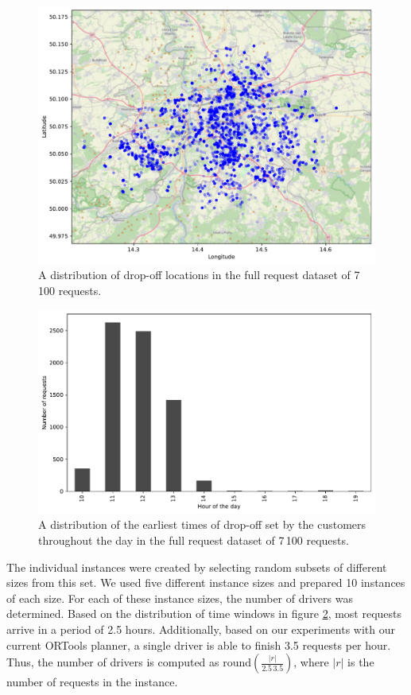     \begin{figure}[!ht]
        \centering
        \includegraphics[width=\textwidth]{figures/dataset-map.pdf}
        \caption{A distribution of drop-off locations in the full request dataset of 7\,100 requests.}
        \label{fig:dataset-map}
    \end{figure}
    
    \begin{figure}[!ht]
        \centering
        \includegraphics[width=\textwidth]{figures/dataset-distribution.pdf}
        \caption{A distribution of the earliest times of drop-off set by the customers throughout the day in the full request dataset of 7\,100 requests.}
        \label{fig:dataset-distribution}
    \end{figure}

    The individual instances were created by selecting random subsets of different sizes from this set. We used five different instance sizes and prepared 10 instances of each size. For each of these instance sizes, the number of drivers was determined. Based on the distribution of time windows in figure \ref{fig:dataset-distribution}, most requests arrive in a period of 2.5 hours. Additionally, based on our experiments with our current ORTools planner, a single driver is able to finish 3.5 requests per hour. Thus, the number of drivers is computed as $\mathrm{round}(\frac{|r|}{2.5\,3.5})$, where $|r|$ is the number of requests in the instance.
    
